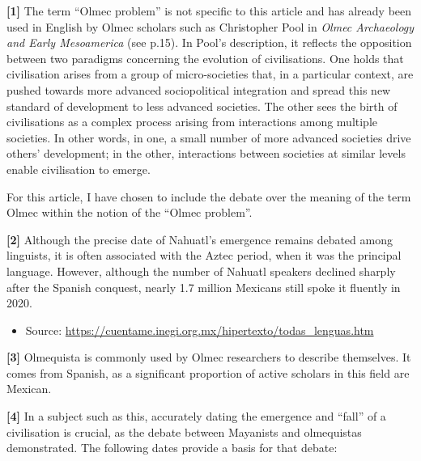 \documentclass[11pt,a4paper]{article}
\begin{document}
\textbf{{[}1{]}} The term ``Olmec problem'' is not specific to this article and has already been used in English by Olmec scholars such as Christopher Pool in \emph{Olmec Archaeology and Early Mesoamerica} (see p.15). In Pool's description, it reflects the opposition between two paradigms concerning the evolution of civilisations. One holds that civilisation arises from a group of micro-societies that, in a particular context, are pushed towards more advanced sociopolitical integration and spread this new standard of development to less advanced societies. The other sees the birth of civilisations as a complex process arising from interactions among multiple societies. In other words, in one, a small number of more advanced societies drive others' development; in the other, interactions between societies at similar levels enable civilisation to emerge.

For this article, I have chosen to include the debate over the meaning of the term Olmec within the notion of the ``Olmec problem''.

\textbf{{[}2{]}} Although the precise date of Nahuatl's emergence remains debated among linguists, it is often associated with the Aztec period, when it was the principal language. However, although the number of Nahuatl speakers declined sharply after the Spanish conquest, nearly 1.7 million Mexicans still spoke it fluently in 2020.

\begin{itemize}
\item Source: \url{https://cuentame.inegi.org.mx/hipertexto/todas_lenguas.htm}
\end{itemize}

\textbf{{[}3{]}} Olmequista is commonly used by Olmec researchers to describe themselves. It comes from Spanish, as a significant proportion of active scholars in this field are Mexican.

\textbf{{[}4{]}} In a subject such as this, accurately dating the emergence and ``fall'' of a civilisation is crucial, as the debate between Mayanists and olmequistas demonstrated. The following dates provide a basis for that debate:
\end{document}

